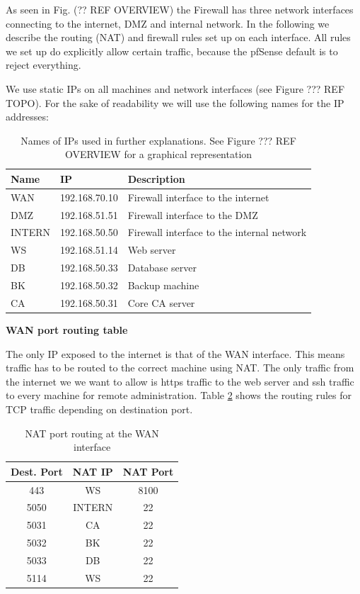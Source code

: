 \documentclass[english]{article}
\begin{document}
As seen in Fig. (?? REF OVERVIEW) the Firewall has three network interfaces connecting to the internet, DMZ and internal network. In the following we describe the routing (NAT) and firewall rules set up on each interface. All rules we set up do explicitly allow certain traffic, because the pfSense default is to reject everything. 

We use static IPs on all machines and network interfaces (see Figure ??? REF TOPO). For the sake of readability we will use the following names for the IP addresses:

\begin{table}[h]
\centering
\begin{tabular}{|l|l|l|}
\hline
\textbf{Name} & \textbf{IP} & \textbf{Description} \\ \hline
WAN & 192.168.70.10 & Firewall interface to the internet \\ \hline
DMZ & 192.168.51.51 & Firewall interface to the DMZ \\ \hline
INTERN & 192.168.50.50 & Firewall interface to the internal network \\ \hline
WS & 192.168.51.14 & Web server \\ \hline
DB & 192.168.50.33 & Database server \\ \hline
BK & 192.168.50.32 & Backup machine \\ \hline
CA & 192.168.50.31 & Core CA server \\ \hline

\end{tabular}
\caption{Names of IPs used in further explanations. See Figure ??? REF OVERVIEW for a graphical representation}
\label{fw_ip_names}
\end{table}


\textbf{WAN port routing table}

The only IP exposed to the internet is that of the WAN interface. This means traffic has to be routed to the correct machine using NAT. The only traffic from the internet we we want to allow is https traffic to the web server and ssh traffic to every machine for remote administration. Table \ref{fw_inet_nat} shows the routing rules for TCP traffic depending on destination port.

\begin{table}[h]
\centering
\begin{tabular}{|c||c|c|}
\hline
\textbf{Dest. Port} & \textbf{NAT IP} & \textbf{NAT Port} \\ \hline
443 & WS & 8100 \\ \hline
5050 & INTERN & 22 \\ \hline
5031 & CA & 22 \\ \hline
5032 & BK & 22 \\ \hline
5033 & DB & 22 \\ \hline
5114 & WS & 22 \\ \hline

\end{tabular}
\caption{NAT port routing at the WAN interface}
\label{fw_inet_nat}
\end{table}
\end{document}
